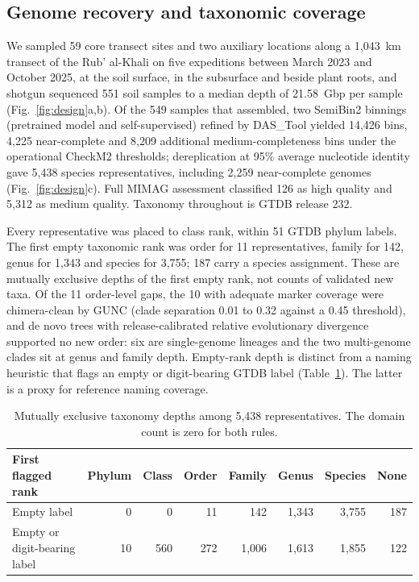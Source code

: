 \documentclass[11pt]{article}
\begin{document}
\subsection*{Genome recovery and taxonomic coverage}

We sampled 59 core transect sites and two auxiliary locations along a 1{,}043~km transect of the Rub' al-Khali on five expeditions between
March 2023 and October 2025, at the soil surface, in the subsurface and beside plant roots, and
shotgun sequenced 551 soil samples to a median depth of 21.58~Gbp per sample (Fig.~\ref{fig:design}a,b).
Of the 549 samples that assembled, two SemiBin2 binnings (pretrained model and self-supervised)
refined by DAS\_Tool yielded 14{,}426 bins, 4{,}225 near-complete and 8{,}209 additional medium-completeness bins
under the operational CheckM2 thresholds; dereplication at 95\% average nucleotide identity gave
5{,}438 species representatives, including 2{,}259 near-complete genomes
(Fig.~\ref{fig:design}c). Full MIMAG assessment classified 126 as high quality and 5{,}312 as medium quality. Taxonomy throughout is GTDB release 232.

Every representative was placed to class rank, within 51 GTDB phylum labels. The first empty
taxonomic rank was order for 11 representatives, family for 142, genus for 1{,}343 and species for
3{,}755; 187 carry a species assignment. These are mutually exclusive depths of
the first empty rank, not counts of validated new taxa. Of the 11 order-level gaps, the 10 with
adequate marker coverage were chimera-clean by GUNC (clade separation 0.01 to 0.32 against a 0.45
threshold), and de novo trees with release-calibrated relative evolutionary divergence supported no
new order: six are single-genome lineages and the two multi-genome clades sit at genus and family
depth. Empty-rank depth is distinct from a naming heuristic that flags an empty or digit-bearing
GTDB label (Table~\ref{tab:naming}). The latter is a proxy for reference naming coverage.

\begin{table}[ht]\centering\small
\caption{Mutually exclusive taxonomy depths among 5,438 representatives. The domain count is zero for both rules.}\label{tab:naming}
\begin{tabular}{lrrrrrrr}\toprule
First flagged rank & Phylum & Class & Order & Family & Genus & Species & None\\\midrule
Empty label & 0 & 0 & 11 & 142 & 1,343 & 3,755 & 187\\
Empty or digit-bearing label & 10 & 560 & 272 & 1,006 & 1,613 & 1,855 & 122\\\bottomrule
\end{tabular}\end{table}
\end{document}
